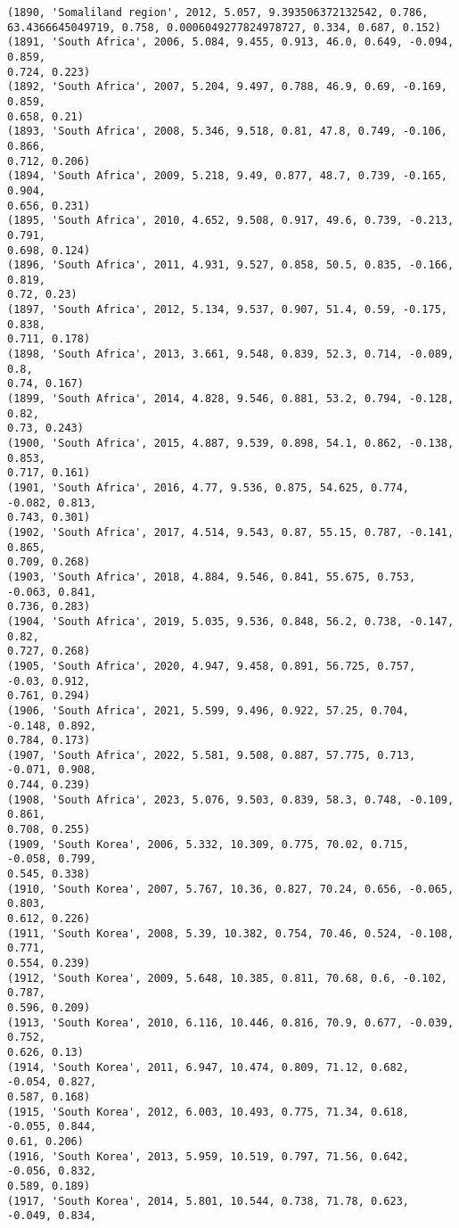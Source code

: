 \documentclass[11pt]{article}
\begin{document}
\begin{Verbatim}[commandchars=\\\{\}]
(1890, 'Somaliland region', 2012, 5.057, 9.393506372132542, 0.786,
63.4366645049719, 0.758, 0.0006049277824978727, 0.334, 0.687, 0.152)
(1891, 'South Africa', 2006, 5.084, 9.455, 0.913, 46.0, 0.649, -0.094, 0.859,
0.724, 0.223)
(1892, 'South Africa', 2007, 5.204, 9.497, 0.788, 46.9, 0.69, -0.169, 0.859,
0.658, 0.21)
(1893, 'South Africa', 2008, 5.346, 9.518, 0.81, 47.8, 0.749, -0.106, 0.866,
0.712, 0.206)
(1894, 'South Africa', 2009, 5.218, 9.49, 0.877, 48.7, 0.739, -0.165, 0.904,
0.656, 0.231)
(1895, 'South Africa', 2010, 4.652, 9.508, 0.917, 49.6, 0.739, -0.213, 0.791,
0.698, 0.124)
(1896, 'South Africa', 2011, 4.931, 9.527, 0.858, 50.5, 0.835, -0.166, 0.819,
0.72, 0.23)
(1897, 'South Africa', 2012, 5.134, 9.537, 0.907, 51.4, 0.59, -0.175, 0.838,
0.711, 0.178)
(1898, 'South Africa', 2013, 3.661, 9.548, 0.839, 52.3, 0.714, -0.089, 0.8,
0.74, 0.167)
(1899, 'South Africa', 2014, 4.828, 9.546, 0.881, 53.2, 0.794, -0.128, 0.82,
0.73, 0.243)
(1900, 'South Africa', 2015, 4.887, 9.539, 0.898, 54.1, 0.862, -0.138, 0.853,
0.717, 0.161)
(1901, 'South Africa', 2016, 4.77, 9.536, 0.875, 54.625, 0.774, -0.082, 0.813,
0.743, 0.301)
(1902, 'South Africa', 2017, 4.514, 9.543, 0.87, 55.15, 0.787, -0.141, 0.865,
0.709, 0.268)
(1903, 'South Africa', 2018, 4.884, 9.546, 0.841, 55.675, 0.753, -0.063, 0.841,
0.736, 0.283)
(1904, 'South Africa', 2019, 5.035, 9.536, 0.848, 56.2, 0.738, -0.147, 0.82,
0.727, 0.268)
(1905, 'South Africa', 2020, 4.947, 9.458, 0.891, 56.725, 0.757, -0.03, 0.912,
0.761, 0.294)
(1906, 'South Africa', 2021, 5.599, 9.496, 0.922, 57.25, 0.704, -0.148, 0.892,
0.784, 0.173)
(1907, 'South Africa', 2022, 5.581, 9.508, 0.887, 57.775, 0.713, -0.071, 0.908,
0.744, 0.239)
(1908, 'South Africa', 2023, 5.076, 9.503, 0.839, 58.3, 0.748, -0.109, 0.861,
0.708, 0.255)
(1909, 'South Korea', 2006, 5.332, 10.309, 0.775, 70.02, 0.715, -0.058, 0.799,
0.545, 0.338)
(1910, 'South Korea', 2007, 5.767, 10.36, 0.827, 70.24, 0.656, -0.065, 0.803,
0.612, 0.226)
(1911, 'South Korea', 2008, 5.39, 10.382, 0.754, 70.46, 0.524, -0.108, 0.771,
0.554, 0.239)
(1912, 'South Korea', 2009, 5.648, 10.385, 0.811, 70.68, 0.6, -0.102, 0.787,
0.596, 0.209)
(1913, 'South Korea', 2010, 6.116, 10.446, 0.816, 70.9, 0.677, -0.039, 0.752,
0.626, 0.13)
(1914, 'South Korea', 2011, 6.947, 10.474, 0.809, 71.12, 0.682, -0.054, 0.827,
0.587, 0.168)
(1915, 'South Korea', 2012, 6.003, 10.493, 0.775, 71.34, 0.618, -0.055, 0.844,
0.61, 0.206)
(1916, 'South Korea', 2013, 5.959, 10.519, 0.797, 71.56, 0.642, -0.056, 0.832,
0.589, 0.189)
(1917, 'South Korea', 2014, 5.801, 10.544, 0.738, 71.78, 0.623, -0.049, 0.834,

\end{Verbatim}
\end{document}
